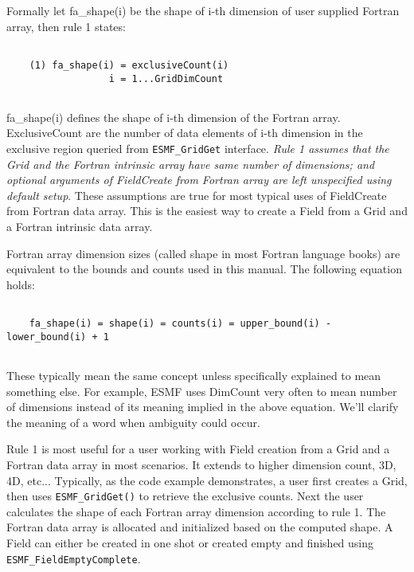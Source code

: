     Formally let fa\_shape(i) be the shape of i-th dimension of user supplied Fortran array,
    then rule 1 states:  
    \begin{verbatim}
   
    (1) fa_shape(i) = exclusiveCount(i)         
                  i = 1...GridDimCount
   
    \end{verbatim}
   
    fa\_shape(i) defines the shape of i-th dimension of the Fortran array.
    ExclusiveCount are the number of data elements of i-th dimension in the exclusive region queried
    from {\tt ESMF\_GridGet} interface. {\em Rule 1 assumes that the Grid and the Fortran intrinsic
    array have same number of dimensions; and optional arguments
    of FieldCreate from Fortran array are left unspecified using default setup}. These assumptions 
    are true for most typical uses of FieldCreate from Fortran data array. This is the easiest way
    to create a Field from a Grid and a Fortran intrinsic data array.
    
    Fortran array dimension sizes (called shape in most Fortran language books) are equivalent
    to the bounds and counts used in this manual.  The following equation holds: 
    \begin{verbatim}
   
    fa_shape(i) = shape(i) = counts(i) = upper_bound(i) - lower_bound(i) + 1
   
    \end{verbatim}
  
    These typically mean the same concept unless specifically explained to mean something else.
    For example, ESMF uses DimCount very often to mean number of dimensions instead of its meaning
    implied in the above equation. We'll clarify the meaning of a word when ambiguity could occur.
    
    Rule 1 is most useful for a user working with Field creation from a Grid and a Fortran
    data array in most scenarios. It extends to higher dimension count, 3D, 4D, etc...
    Typically, as the code example demonstrates, a user first creates a Grid,
    then uses {\tt ESMF\_GridGet()}
    to retrieve the exclusive counts.  Next the user calculates the shape
    of each Fortran array dimension according to rule 1. The Fortran data array is allocated
    and initialized based on the computed shape.  A Field can either be created in one shot or
    created empty and finished using {\tt ESMF\_FieldEmptyComplete}.
  
